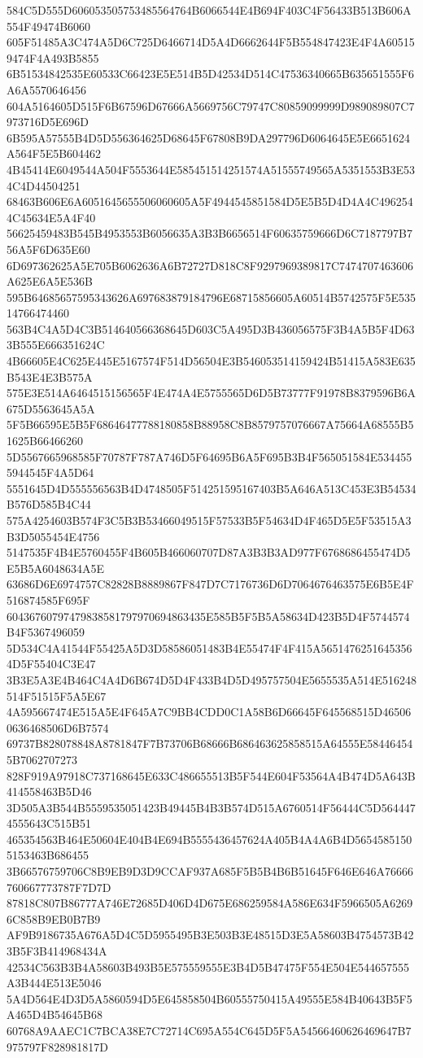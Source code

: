 {{{{{{{{{{{{{{{{{{{{{584C5D555D606053505753485564764B6066544E4B694F403C4F56433B513B606A554F49474B6060
605F51485A3C474A5D6C725D6466714D5A4D6662644F5B554847423E4F4A605159474F4A493B5855
6B51534842535E60533C66423E5E514B5D42534D514C47536340665B635651555F6A6A5570646456
604A5164605D515F6B67596D67666A5669756C79747C80859099999D989089807C7973716D5E696D
6B595A57555B4D5D556364625D68645F67808B9DA297796D6064645E5E6651624A564F5E5B604462
4B45414E6049544A504F5553644E585451514251574A51555749565A5351553B3E534C4D44504251
68463B606E6A6051645655506060605A5F4944545851584D5E5B5D4D4A4C4962544C45634E5A4F40
56625459483B545B4953553B6056635A3B3B6656514F60635759666D6C7187797B756A5F6D635E60
6D697362625A5E705B6062636A6B72727D818C8F9297969389817C7474707463606A625E6A5E536B
595B64685657595343626A697683879184796E68715856605A60514B5742575F5E53514766474460
563B4C4A5D4C3B514640566368645D603C5A495D3B436056575F3B4A5B5F4D633B555E666351624C
4B66605E4C625E445E5167574F514D56504E3B546053514159424B51415A583E635B543E4E3B575A
575E3E514A6464515156565F4E474A4E5755565D6D5B73777F91978B8379596B6A675D5563645A5A
5F5B66595E5B5F68646477788180858B88958C8B8579757076667A75664A68555B51625B66466260
5D5567665968585F70787F787A746D5F64695B6A5F695B3B4F565051584E5344555944545F4A5D64
5551645D4D555556563B4D4748505F514251595167403B5A646A513C453E3B54534B576D585B4C44
575A4254603B574F3C5B3B53466049515F57533B5F54634D4F465D5E5F53515A3B3D5055454E4756
5147535F4B4E5760455F4B605B466060707D87A3B3B3AD977F6768686455474D5E5B5A6048634A5E
63686D6E6974757C82828B8889867F847D7C7176736D6D7064676463575E6B5E4F516874585F695F
60436760797479838581797970694863435E585B5F5B5A58634D423B5D4F5744574B4F5367496059
5D534C4A41544F55425A5D3D58586051483B4E55474F4F415A56514762516453564D5F55404C3E47
3B3E5A3E4B464C4A4D6B674D5D4F433B4D5D495757504E5655535A514E516248514F51515F5A5E67
4A595667474E515A5E4F645A7C9BB4CDD0C1A58B6D66645F645568515D465060636468506D6B7574
69737B828078848A8781847F7B73706B68666B686463625858515A64555E584464545B7062707273
828F919A97918C737168645E633C486655513B5F544E604F53564A4B474D5A643B414558463B5D46
3D505A3B544B5559535051423B49445B4B3B574D515A6760514F56444C5D5644474555643C515B51
465354563B464E50604E404B4E694B5555436457624A405B4A4A6B4D56545851505153463B686455
3B66576759706C8B9EB9D3D9CCAF937A685F5B5B4B6B51645F646E646A76666760667773787F7D7D
87818C807B86777A746E72685D406D4D675E686259584A586E634F5966505A62696C858B9EB0B7B9
AF9B9186735A676A5D4C5D5955495B3E503B3E48515D3E5A58603B4754573B423B5F3B414968434A
42534C563B3B4A58603B493B5E575559555E3B4D5B47475F554E504E544657555A3B444E513E5046
5A4D564E4D3D5A5860594D5E645858504B60555750415A49555E584B40643B5F5A465D4B54645B68
60768A9AAEC1C7BCA38E7C72714C695A554C645D5F5A54566460626469647B7975797F828981817D
}}}}}}}}}}}}}}}}}}}}}
